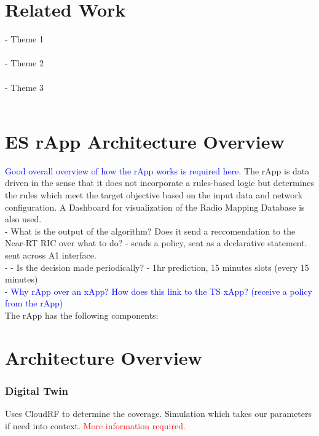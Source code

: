 \documentclass[conference]{IEEEtran}
\begin{document}
\section{Related Work}

- Theme 1 \\
\\
- Theme 2 \\
\\
- Theme 3 \\
\\

\section{ES rApp Architecture Overview}

\textcolor{blue}{Good overall overview of how the rApp works is required here}. The rApp is data driven in the sense that it does not incorporate a rules-based logic but determines the rules which meet the target objective based on the input data and network configuration. A Dashboard for visualization of the Radio Mapping Database is also used. \\
- What is the output of the algorithm? Does it send a reccomendation to the Near-RT RIC over what to do? - sends a policy, sent as a declarative statement. sent across A1 interface. \\
- - Is the decision made periodically? - 1hr prediction, 15 minutes slots (every 15 minutes) \\

- \textcolor{blue}{Why rApp over an xApp? How does this link to the TS xApp? (receive a policy from the rApp)}  \\

The rApp has the following components: \\

\section{Architecture Overview}



\subsubsection{Digital Twin}

Uses CloudRF to determine the coverage. Simulation which takes our parameters if need into context. \textcolor{red}{More information required.} \\
\end{document}
